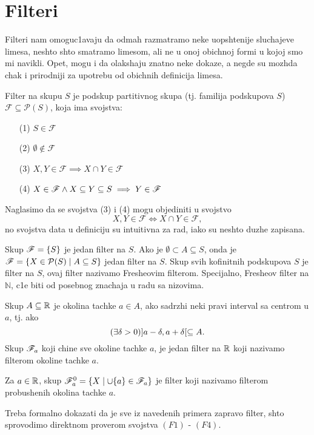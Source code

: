 \documentclass[../main_og.tex]{subfiles}
\begin{document}
\section{Filteri}

    Filteri nam omoguc1avaju da odmah razmatramo neke uopshtenije sluchajeve limesa, neshto shto smatramo limesom, ali ne u onoj obichnoj formi u kojoj smo mi navikli. Opet, mogu i da olakshaju znatno neke dokaze, a negde su mozhda chak i prirodniji za upotrebu od obichnih definicija limesa.

    {\de Filter na skupu $S$ je podskup partitivnog skupa (tj. familija podskupova $S$) $\mathscr{F}\subseteq\mathcal{P}(S)$, koja ima svojstva:
    \begin{itemize}
        \item[({\latin{F}}1)] $S \in \mathscr{F}$  
        \item[({\latin{F}}2)] $\emptyset \notin \mathscr{F}$
        \item[({\latin{F}}3)] $X,Y \in \mathscr{F} \implies X\cap Y \in \mathscr{F}$
        \item[({\latin{F}}4)] $X \in \mathscr{F} \land X \subseteq Y\subseteq S\implies Y \in \mathscr{F}$
    \end{itemize}
    }

\nap Naglasimo da se svojstva ({3}) i ({4}) mogu objediniti u svojstvo $$X,Y \in \mathscr{F} \iff X\cap Y \in \mathscr{F},$$ no svojstva data u definiciju su intuitivna za rad, iako su neshto duzhe zapisana.

    {\pr Skup $\mathscr{F}=\{S\}$ je jedan filter na $S$.}
    {\pr Ako je $\emptyset \subset A\subseteq S$, onda je $\mathscr{F}=\{X\in \mathcal{P}(S)\mid A\subseteq S\}$ jedan filter na $S$.}
    {\pr Skup svih kofinitnih podskupova $S$ je filter na $S$, ovaj filter nazivamo Fresheovim filterom. Specijalno, Fresheov filter na $\mathbb{N}$, c1e biti od posebnog znachaja u radu sa nizovima.}

   {\pr Skup $A\subseteq \mathbb{R}$ je okolina tachke $a \in A$, ako sadrzhi neki pravi interval sa centrom u $a$, tj. ako $$(\exists \delta > 0) ]a-\delta,a+\delta[ \subseteq A.$$ Skup $\mathscr{F}_a$ koji chine sve okoline tachke $a$, je jedan filter na $\mathbb{R}$ koji nazivamo filterom okoline tachke $a$.}

   {\pr Za $a \in \mathbb{R}$, skup $\mathscr{F}_a^0=\{X\mid\cup \{a\}\in \mathscr{F}_a\}$ je filter koji nazivamo filterom probushenih okolina tachke $a$.}

   \nap Treba formalno dokazati da je sve iz navedenih primera zapravo filter, shto sprovodimo direktnom proverom svojstva $(F1)$ - $(F4)$.
\end{document}
